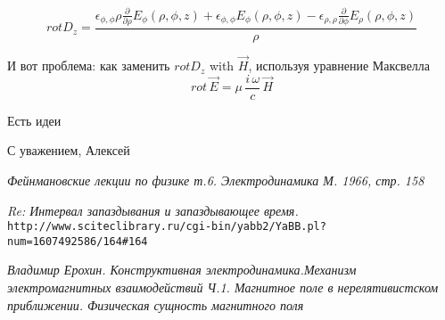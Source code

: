 \documentclass{article}
\begin{document}
$$rot D_{z}=\frac{{\epsilon}_{\phi,\phi} {\rho} \frac{\partial}{\partial {\rho}}E_{\phi}\left({\rho}, {\phi}, \mathit{z}\right) + {\epsilon}_{\phi,\phi} E_{\phi}\left({\rho}, {\phi}, \mathit{z}\right) - {\epsilon}_{\rho,\rho} \frac{\partial}{\partial {\phi}}E_{\rho}\left({\rho}, {\phi}, \mathit{z}\right)}{{\rho}}$$

И вот проблема: как заменить $rot D_{z}$ with $\vec{H}$, используя уравнение Максвелла
$$rot\,\vec{E} = \mu\,\frac{i\,\omega}{c}\,\vec{H}$$

Есть идеи



С уважением, Алексей

\begin{thebibliography}{99}



\textit{Фейнмановские лекции по физике т.6. Электродинамика М. 1966, стр. 158}

\textit{Re: Интервал запаздывания и запаздывающее время.}
\\\texttt{http://www.sciteclibrary.ru/cgi-bin/yabb2/YaBB.pl?num=1607492586/164\#164}

\textit{Владимир Ерохин. Конструктивная электродинамика.Механизм электромагнитных взаимодействий Ч.1. Магнитное поле в нерелятивистском приближении. Физическая сущность магнитного поля}








\end{thebibliography}
\end{document}
